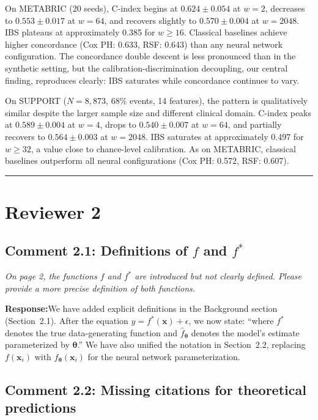 \documentclass[12pt,a4paper]{article}
\newcommand{\comment}[1]{%
  \begin{reviewerbox}
    \textit{#1}
  \end{reviewerbox}
}
\newcommand{\response}{\noindent\textbf{Response:}\quad}
\newcommand{\bx}{\bm{x}}
\newcommand{\btheta}{\bm{\theta}}
\begin{document}
On METABRIC (20 seeds), C-index begins at $0.624 \pm 0.054$ at $w = 2$,
decreases to $0.553 \pm 0.017$ at $w = 64$, and recovers slightly to
$0.570 \pm 0.004$ at $w = 2048$. IBS plateaus at approximately 0.385 for
$w \geq 16$. Classical baselines achieve higher concordance (Cox PH: 0.633,
RSF: 0.643) than any neural network configuration. The concordance double
descent is less pronounced than in the synthetic setting, but the
calibration-discrimination decoupling, our central finding, reproduces
clearly: IBS saturates while concordance continues to vary.

On SUPPORT ($N = 8{,}873$, 68\% events, 14 features), the pattern is
qualitatively similar despite the larger sample size and different clinical
domain. C-index peaks at $0.589 \pm 0.004$ at $w = 4$, drops to
$0.540 \pm 0.007$ at $w = 64$, and partially recovers to $0.564 \pm 0.003$
at $w = 2048$. IBS saturates at approximately 0.497 for $w \geq 32$, a value
close to chance-level calibration. As on METABRIC, classical baselines
outperform all neural configurations (Cox PH: 0.572, RSF: 0.607).


\bigskip
\hrule
\bigskip

\section*{Reviewer 2}

\subsection*{Comment 2.1: Definitions of $f$ and $f^*$}

\comment{On page 2, the functions $f$ and $f^*$ are introduced but not clearly defined. Please provide a more precise definition of both functions.}

\response We have added explicit definitions in the Background section
(Section~2.1). After the equation $y = f^*(\bx) + \epsilon$, we now state:
``where $f^*$ denotes the true data-generating function and $\hat{f}_{\btheta}$
denotes the model's estimate parameterized by $\btheta$.'' We have also
unified the notation in Section~2.2, replacing $f(\bx_i)$ with
$f_{\btheta}(\bx_i)$ for the neural network parameterization.


\bigskip

\subsection*{Comment 2.2: Missing citations for theoretical predictions}
\end{document}

